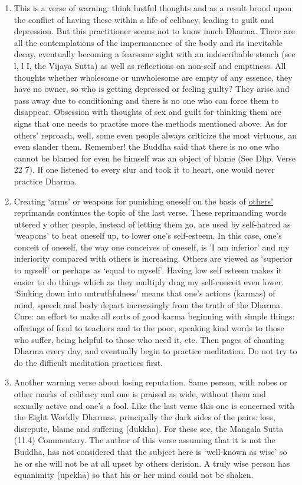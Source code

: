 \begin{enumerate}
\item This is a verse of warning: think lustful thoughts and as a result brood upon the conflict of having these within a life of celibacy, leading to guilt and depression. But this practitioner seems not to know much Dharma. There are all the contemplations of the impermanence of the body and its inevitable decay, eventually becoming a fearsome sight with an indescribable stench (see l, l I, the Vijaya Sutta) as well as reflections on non-self and emptiness. All thoughts whether wholesome or unwholesome are empty of any essence, they have no owner, so who is getting depressed or feeling guilty? They arise and pass away due to conditioning and there is no one who can force them to disappear. Obsession with thoughts of sex and guilt for thinking them are signs that one needs to practise more the methods mentioned above. As for others' reproach, well, some even people always criticize the most virtuous, an even slander them. Remember! the Buddha said that there is no one who cannot be blamed for even he himself was an object of blame (See Dhp. Verse 22 7). If one listened to every slur and took it to heart, one would never practice Dharma.

\item Creating `arms' or weapons for punishing oneself on the basis of \underline{others'} reprimands continues the topic of the last verse. These reprimanding words uttered y other people, instead of letting them go, are used by self-hatred as `weapons' to beat oneself up, to lower one's self-esteem. In this case, one's conceit of oneself, the way one conceives of oneself, is 'I am inferior' and my inferiority compared with others is increasing. Others are viewed as `superior to myself' or perhaps as `equal to myself'. Having low self esteem makes it easier to do things which as they multiply drag my self-conceit even lower. `Sinking down into untruthfulness' means that one's actions (karmas) of mind, speech and body depart increasingly from the truth of the Dharma. Cure: an effort to make all sorts of good karma beginning with simple things: offerings of food to teachers and to the poor, speaking kind words to those who suffer, being helpful to those who need it, etc. Then pages of chanting Dharma every day, and eventually begin to practice meditation. Do not try to do the difficult meditation practices first.

\item{Another warning verse about losing reputation. Same person, with robes or other marks of celibacy and one is praised as wide, without them and sexually active and one's a fool. Like the last verse this one is concerned with the Eight Worldly Dharmas, principally the dark sides of the pairs: loss, disrepute, blame and suffering (dukkha). For these see, the Mangala Sutta (11.4) Commentary. The author of this verse assuming that it is not the Buddha, has not considered that the subject here is `well-known as wise' so he or she will not be at all upset by others derision. A truly wise person has equanimity (upekh\=a) so that his or her mind could not be shaken.

}
\end{enumerate}
